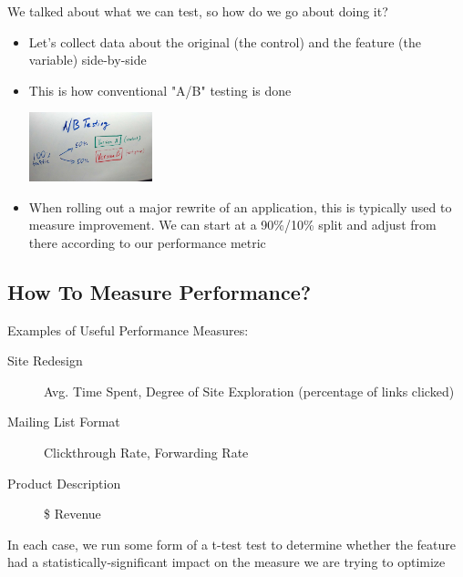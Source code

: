 \documentclass[]{beamer}
\theoremstyle{definition}
\begin{document}
\begin{frame}
	We talked about what we can test, so how do we go about doing it?
	\begin{itemize}[<+->]
		\item Let's collect data about the original (the control) and the feature (the variable) side-by-side
		\item This is how conventional "A/B" testing is done
		\begin{center}
		\includegraphics[height=2cm]{resources/ab_testing.jpg}
		\end{center}
		\item When rolling out a major rewrite of an application, this is typically used to measure improvement.  We can start at a 90\%/10\% split and adjust from there according to our performance metric
	\end{itemize}
\end{frame}


\subsection{How To Measure Performance?}

\begin{frame}
Examples of Useful Performance Measures:
\begin{description}
\item[Site Redesign] Avg. Time Spent, Degree of Site Exploration (percentage of links clicked)
\item[Mailing List Format] Clickthrough Rate, Forwarding Rate
\item[Product Description] \$ Revenue
\end{description}

In each case, we run some form of a t-test test to determine whether the feature had a statistically-significant impact on the measure we are trying to optimize
\end{frame}
\end{document}
